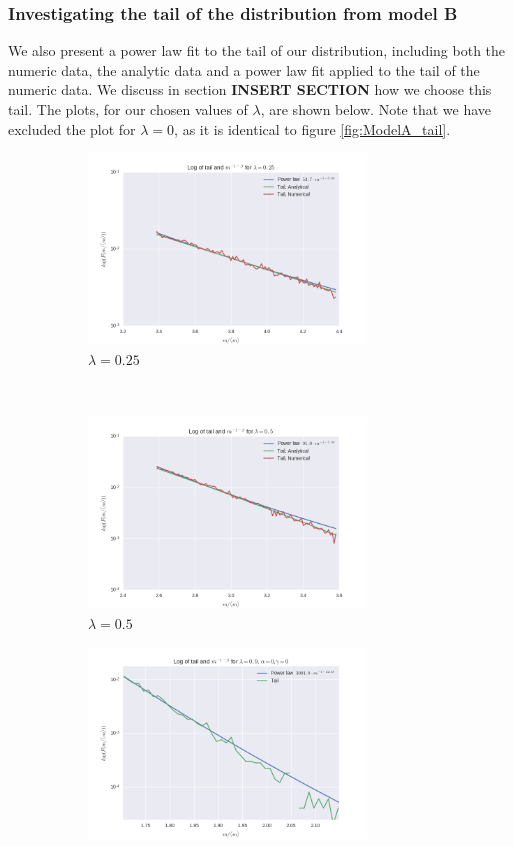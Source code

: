 \documentclass[a4paper, 10pt]{article}
\begin{document}
\subsubsection{Investigating the tail of the distribution from model B}
We also present a power law fit to the tail of our distribution, including both the numeric data, the analytic data and a power law fit applied to the tail of the numeric data. We discuss in section \textbf{INSERT SECTION} how we choose this tail. The plots, for our chosen values of $\lambda$, are shown below. Note that we have excluded the plot for $\lambda = 0$, as it is identical to figure \ref{fig:ModelA_tail}.
\begin{figure}[!ht] %
    \centering
    \begin{subfigure}[H!]{0.5\textwidth}
        \centering
        \includegraphics[height=2.0in]{tailPowerlamb025.png} %
        \caption{$\lambda = 0.25$}\label{fig:ModelB_tail_lamb_025}
    \end{subfigure}%
    ~ 
    \begin{subfigure}[H!]{0.5\textwidth}
        \centering
        \includegraphics[height=2.0in]{tailPowerlamb05.png}
        \caption{$\lambda = 0.5$}\label{fig:ModelB_tail_lamb_05}
    \end{subfigure}
    \begin{subfigure}[H!]{0.5\textwidth}
        \centering
        \includegraphics[height=2.0in]{tailLamb9_2.png}

\end{subfigure}
\end{figure}
\end{document}
